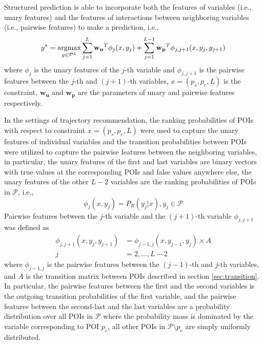 Structured prediction is able to incorporate both the features of variables (i.e., unary features) and
the features of interactions between neighboring variables (i.e., pairwise features) to make a prediction, i.e.,
\begin{displaymath}
    y^* = \operatorname*{argmax}_{y \in \mathcal{P}^L} \sum_{j=1}^L \mathbf{w_u}^T \phi_j(x, y_j) +
                                        \sum_{j=1}^{L-1} \mathbf{w_p}^T \phi_{j, j+1}(x, y_j, y_{j+1})
\end{displaymath}
where $\phi_j$ is the unary features of the $j$-th variable and $\phi_{j, j+1}$ is the pairwise features between
the $j$-th and $(j+1)$-th variables, $x = (p_s, p_e, L)$ is the constraint, $\mathbf{w_u}$ and $\mathbf{w_p}$ are the
parameters of unary and pairwise features respectively.

In the settings of trajectory recommendation, the ranking probabilities of POIs
with respect to constraint $x = (p_s, p_e, L)$ were used to capture the unary features of individual variables
and the transition probabilities between POIs were utilized to capture the pairwise features
between the neighboring variables, in particular,
the unary features of the first and last variables are binary vectors
with true values at the corresponding POIs and false values anywhere else,
the unary features of the other $L-2$ variables are the ranking probabilities of POIs in $\mathcal{P}$, i.e.,
\begin{displaymath}
    \phi_j(x, y_j) = P_R(y_j | x), y_j \in \mathcal{P}
\end{displaymath}
Pairwise features between the $j$-th variable and the $(j+1)$-th variable $\phi_{j, j+1}$ was defined as
\begin{align*}
    \phi_{j, j+1}(x, y_j, y_{j+1}) &= \phi_{j-1, j}(x, y_{j-1}, y_j) \times A \\
                                 j &=2, \dots, L-2
\end{align*}
where $\phi_{j-1, j}$ is the pairwise features between the $(j-1)$-th and $j$-th variables,
and $A$ is the transition matrix between POIs described in section \ref{sec:transition}.
In particular, the pairwise features between the first and the second variables is the
outgoing transition probabilities of the first variable,
and the pairwise features between the second-last and the last variables are a probability distribution
over all POIs in $\mathcal{P}$ where the probability mass is dominated by the variable corresponding to POI $p_e$,
all other POIs in $\mathcal{P} \setminus p_e$ are simply uniformly distributed.

